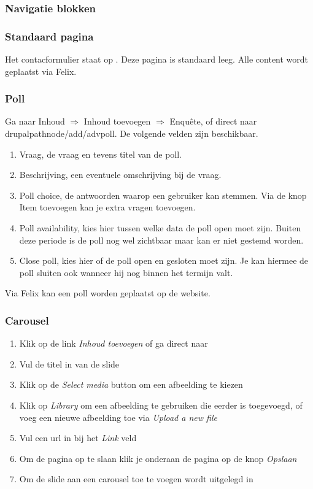 \subsubsection{Navigatie blokken}


\subsubsection{Standaard pagina}\label{pagenode}

Het contacformulier staat op . Deze pagina is standaard leeg. Alle content wordt geplaatst via Felix.


\subsubsection{Poll}
Ga naar Inhoud $\Rightarrow$ Inhoud toevoegen $\Rightarrow$ Enqu\^{e}te, of direct naar drupalpath{node/add/advpoll}. De volgende velden zijn beschikbaar.
\begin{enumerate}
\item Vraag, de vraag en tevens titel van de poll.
\item Beschrijving, een eventuele omschrijving bij de vraag.
\item Poll choice, de antwoorden waarop een gebruiker kan stemmen. Via de knop Item toevoegen kan je extra vragen toevoegen.
\item Poll availability, kies hier tussen welke data de poll open moet zijn. Buiten deze periode is de poll nog wel zichtbaar maar kan er niet gestemd worden.
\item Close poll, kies hier of de poll open en gesloten moet zijn. Je kan hiermee de poll sluiten ook wanneer hij nog binnen het termijn valt.
\end{enumerate}

Via Felix kan een poll worden geplaatst op de website.


\subsubsection{Carousel}
\begin{enumerate}
\item Klik op de link \emph{Inhoud toevoegen} of ga direct naar \
\item Vul de titel in van de slide
\item Klik op de \emph{Select media} button om een afbeelding te kiezen
\item Klik op \emph{Library} om een afbeelding te gebruiken die eerder is toegevoegd,  of voeg een nieuwe afbeelding toe via \emph{Upload a new file}
\item Vul een url in bij het \emph{Link} veld
\item Om de pagina op te slaan klik je onderaan de pagina op de knop \emph{Opslaan}
\item Om de slide aan een carousel toe te voegen wordt uitgelegd in 
\end{enumerate}

